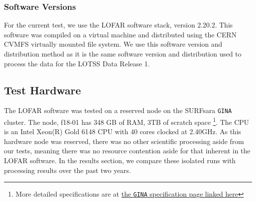 \subsubsection{Software Versions}\label{sec:ch6_software_versions}
For the current test, we use the LOFAR software stack, version 2.20.2\citep{cookbook}. This software was compiled on a virtual machine and distributed using the CERN CVMFS virtually mounted file system. We use this software version and distribution method as it is the same software version and distribution used to process the data for the LOTSS Data Release 1. 

\subsection{Test Hardware}\label{sec:ch6_hardware}

The LOFAR software was tested on a reserved node on the SURFsara \texttt{GINA} cluster. The node, f18-01 has 348 GB of RAM, 3TB of scratch space \footnote{More detailed specifications are at \href{http://docs.surfsaralabs.nl/projects/grid/en/latest/Pages/Service/system_specifications/gina_specs.html}{the \texttt{GINA} specification page linked here}}. The CPU is an Intel Xeon(R) Gold 6148 CPU with 40 cores clocked at 2.40GHz.  As this hardware node was reserved, there was no other scientific processing aside from our tests, meaning there was no resource contention aside for that inherent in the LOFAR software. In the results section, we compare these isolated runs with processing results over the past two years. 
